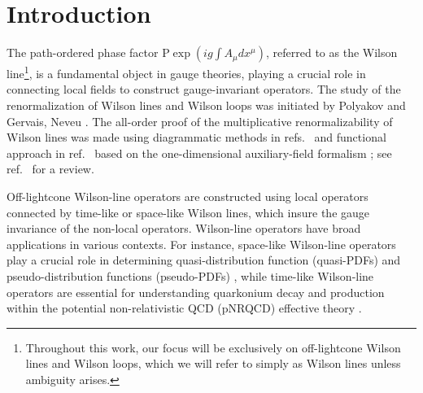 \section{Introduction}
The path-ordered phase factor $\text{P}\exp\left(ig\int A_{\mu} dx^{\mu}\right)$, referred to as the Wilson line\footnote{Throughout this work, our focus will be exclusively on off-lightcone Wilson lines and Wilson loops, which we will refer to simply as Wilson lines unless ambiguity arises.}, is  a fundamental object  in gauge theories,  playing a crucial role in connecting local fields to construct gauge-invariant operators. The study of the renormalization of  Wilson lines and Wilson loops was initiated by Polyakov \cite{Polyakov:1980ca}  and Gervais, Neveu \cite{Gervais:1979fv}. 
The all-order proof of the multiplicative renormalizability of Wilson lines was made using diagrammatic methods in refs.~\cite{Dotsenko:1979wb,Craigie:1980qs} and functional approach in ref.~\cite{Dorn:1986dt} based on the one-dimensional auxiliary-field formalism \cite{Gervais:1979fv,Arefeva:1980zd, Arefeva:1980uy,Samuel:1978iy,Brandt:1978wc}; see ref.~\cite{Dorn:1986dt} for a review. 

Off-lightcone Wilson-line operators are constructed using local operators connected by time-like or space-like Wilson lines, which insure the gauge invariance of the non-local operators.  Wilson-line operators have broad applications in various contexts. For instance, space-like Wilson-line operators play a crucial role in determining quasi-distribution function (quasi-PDFs) \cite{Ji:2013dva} and pseudo-distribution functions (pseudo-PDFs) \cite{Radyushkin:2017cyf}, while time-like Wilson-line operators are essential for understanding quarkonium decay and production within the potential non-relativistic QCD (pNRQCD) effective theory \cite{Pineda:1997bj,Brambilla:1999xf,Brambilla:2004jw,Brambilla:2001xy,Brambilla:2002nu,Brambilla:2020ojz,Brambilla:2021abf,Brambilla:2022rjd,Brambilla:2022ayc}.


